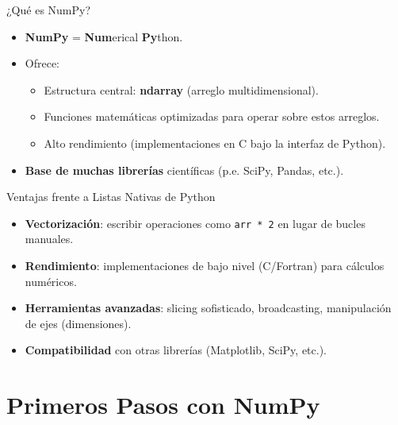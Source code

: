 \documentclass[10pt]{beamer}
\begin{document}
\begin{frame}{¿Qué es NumPy?}
  \begin{itemize}
    \item \textbf{NumPy} = \textbf{Num}erical \textbf{Py}thon.
    \item Ofrece:
      \begin{itemize}
        \item Estructura central: \textbf{ndarray} (arreglo multidimensional).
        \item Funciones matemáticas optimizadas para operar sobre estos arreglos.
        \item Alto rendimiento (implementaciones en C bajo la interfaz de Python).
      \end{itemize}
    \item \textbf{Base de muchas librerías} científicas (p.e. SciPy, Pandas, etc.).
  \end{itemize}
\end{frame}

\begin{frame}{Ventajas frente a Listas Nativas de Python}
  \begin{itemize}
    \item \textbf{Vectorización}: escribir operaciones como \texttt{arr * 2} en lugar de bucles manuales.
    \item \textbf{Rendimiento}: implementaciones de bajo nivel (C/Fortran) para cálculos numéricos.
    \item \textbf{Herramientas avanzadas}: slicing sofisticado, broadcasting, manipulación de ejes (dimensiones).
    \item \textbf{Compatibilidad} con otras librerías (Matplotlib, SciPy, etc.).
  \end{itemize}
\end{frame}

\section{Primeros Pasos con NumPy}
\end{document}
